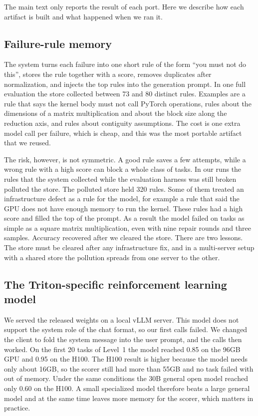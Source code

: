 The main text only reports the result of each port. Here we describe how each artifact is built and
what happened when we ran it.

\subsection{Failure-rule memory}
The system turns each failure into one short rule of the form ``you must not do this'', stores the
rule together with a score, removes duplicates after normalization, and injects the top rules into
the generation prompt. In one full evaluation the store collected between 73 and 80 distinct rules.
Examples are a rule that says the kernel body must not call PyTorch operations, rules about the
dimensions of a matrix multiplication and about the block size along the reduction axis, and rules
about contiguity assumptions. The cost is one extra model call per failure, which is cheap, and this
was the most portable artifact that we reused.

The risk, however, is not symmetric. A good rule saves a few attempts, while a wrong rule with a
high score can block a whole class of tasks. In our runs the rules that the system collected while
the evaluation harness was still broken polluted the store. The polluted store held 320 rules. Some
of them treated an infrastructure defect as a rule for the model, for example a rule that said the
GPU does not have enough memory to run the kernel. These rules had a high score and filled the top
of the prompt. As a result the model failed on tasks as simple as a square matrix multiplication,
even with nine repair rounds and three samples. Accuracy recovered after we cleared the store. There
are two lessons. The store must be cleared after any infrastructure fix, and in a multi-server setup
with a shared store the pollution spreads from one server to the other.

\subsection{The Triton-specific reinforcement learning model}
We served the released weights on a local vLLM server. This model does not support the system role
of the chat format, so our first calls failed. We changed the client to fold the system message into
the user prompt, and the calls then worked. On the first 20 tasks of Level~1 the model reached 0.85
on the 96GB GPU and 0.95 on the H100. The H100 result is higher because the model needs only about
16GB, so the scorer still had more than 55GB and no task failed with out of memory. Under the same
conditions the 30B general open model reached only 0.60 on the H100. A small specialized model
therefore beats a large general model and at the same time leaves more memory for the scorer, which
matters in practice.

